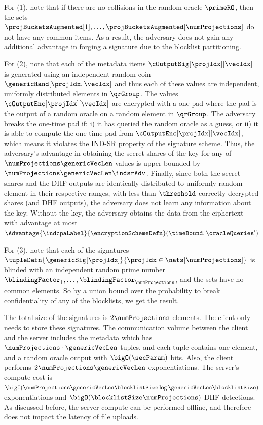 \begin{proofsketch}
	For (1), note that if there are no collisions in the random oracle $\primeRO$, then the sets 
	$\projBucketsAugmented[1], \dots, \projBucketsAugmented[\numProjections]$ do not have any 
	common items. As a result, the adversary does not gain any additional advantage in forging a 
	signature due to the blocklist partitioning. 

	For (2), note that each of the metadata items $\cOutputSig[\projIdx][\vecIdx]$ is generated 
	using an independent random coin $\genericRand[\projIdx, \vecIdx]$ and thus each of these 
	values are independent, uniformly distributed elements in $\qrGroup$. The values 
	$\cOutputEnc[\projIdx][\vecIdx]$ are encrypted with a one-pad where the pad is the output of a 
	random oracle on a random element in $\qrGroup$. The adversary breaks the one-time pad if: i) 
	it has queried the random oracle as a guess, or ii) it is able to compute the one-time pad
	from $\cOutputEnc[\projIdx][\vecIdx]$, which means it violates the IND-SR property of the 
	signature scheme. Thus, the adversary's advantage in obtaining the secret shares of the key for 
	any of 	$\numProjections \genericVecLen$ values is upper bounded by $\numProjections 
	\genericVecLen \indsrAdv$. Finally, since both the secret shares and the DHF outputs are 
	identically distributed to 
	uniformly random element in their respective ranges, with less than $\threshold$ correctly 
	decrypted shares (and DHF outputs), the adversary does not learn any information about the key. 
	Without the key, the adversary obtains the data from the ciphertext with advantage at most 
	$\Advantage{\indcpaLabel}{\encryptionSchemeDefn}(\timeBound, 
	\oracleQueries') $
	
	For (3), note that each of the signatures $\tupleDefn{\genericSig[\projIdx]}{\projIdx \in 
	\nats[\numProjections]}$ is blinded with an independent random prime number 
	$\blindingFactor_1, \dots, \blindingFactor_{\numProjections}$, and the sets have no common 
	elements. So by a union bound over the probability to break confidentiality of any of the blocklists, 
	we get the result. 
\end{proofsketch}


%
The total size of the signatures is $2\numProjections$ \qrGroup elements. The client only needs to 
store these signatures. The communication volume between the client and the server 
includes the metadata which has $\numProjections \cdot \genericVecLen$ tuples, and each tuple 
contains one \qrGroup element, and a random oracle output with $\bigO(\secParam)$ 
bits. Also, the client performs $2\numProjections \genericVecLen$
exponentiations. The server's compute cost is $\bigO(\numProjections \genericVecLen \blocklistSize 
\log \genericVecLen \blocklistSize )$ exponentiations and $\bigO(\blocklistSize 
\numProjections)$ DHF detections. As discussed before, the server compute can be performed 
offline, and therefore does not impact the latency of file uploads. 










